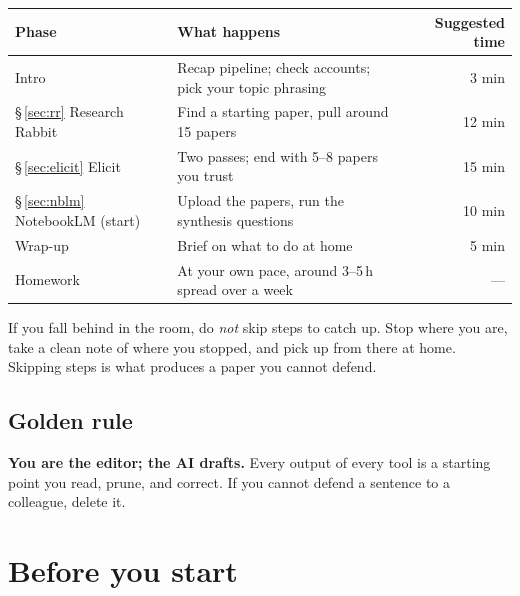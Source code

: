 \documentclass[11pt,a4paper]{article}
\begin{document}
\begin{center}
\small
\begin{tabularx}{\linewidth}{@{}l X r@{}}
\toprule
\textbf{Phase} & \textbf{What happens} & \textbf{Suggested time} \\
\midrule
Intro & Recap pipeline; check accounts; pick your topic phrasing & 3 min \\
\S\,\ref{sec:rr} Research Rabbit & Find a starting paper, pull around 15 papers & 12 min \\
\S\,\ref{sec:elicit} Elicit & Two passes; end with 5--8 papers you trust & 15 min \\
\S\,\ref{sec:nblm} NotebookLM (start) & Upload the papers, run the synthesis questions & 10 min \\
Wrap-up & Brief on what to do at home & 5 min \\
\midrule
Homework & At your own pace, around 3--5\,h spread over a week & --- \\
\bottomrule
\end{tabularx}
\end{center}

\noindent If you fall behind in the room, do \emph{not} skip steps to catch up. Stop where you are, take a clean note of where you stopped, and pick up from there at home. Skipping steps is what produces a paper you cannot defend.

\subsection{Golden rule}

\begin{tipbox}
\textbf{You are the editor; the AI drafts.} Every output of every tool is a starting point you read, prune, and correct. If you cannot defend a sentence to a colleague, delete it.
\end{tipbox}

\section{Before you start}
\label{sec:setup}
\end{document}
